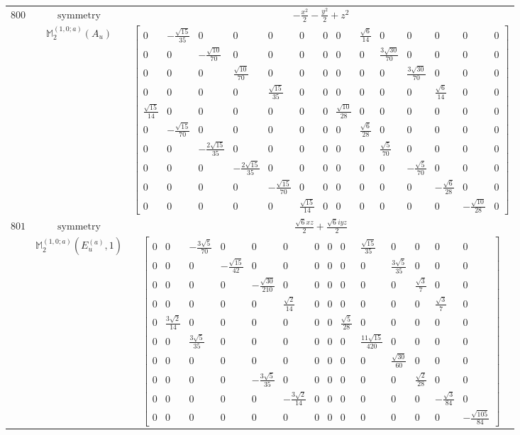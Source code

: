\documentclass[fleqn,8pt,landscape]{jsarticle}
\begin{document}
\begin{longtable}{ccc}
$ 800 $ & $ \text{symmetry} $ & $ - \frac{x^{2}}{2} - \frac{y^{2}}{2} + z^{2} $ \\
$  $ & $ \mathbb{M}_{2}^{(1,0;a)}(A_{u}) $ & $ \begin{bmatrix} 0 & - \frac{\sqrt{15}}{35} & 0 & 0 & 0 & 0 & 0 & 0 & \frac{\sqrt{6}}{14} & 0 & 0 & 0 & 0 & 0 \\ 0 & 0 & - \frac{\sqrt{10}}{70} & 0 & 0 & 0 & 0 & 0 & 0 & \frac{3 \sqrt{30}}{70} & 0 & 0 & 0 & 0 \\ 0 & 0 & 0 & \frac{\sqrt{10}}{70} & 0 & 0 & 0 & 0 & 0 & 0 & \frac{3 \sqrt{30}}{70} & 0 & 0 & 0 \\ 0 & 0 & 0 & 0 & \frac{\sqrt{15}}{35} & 0 & 0 & 0 & 0 & 0 & 0 & \frac{\sqrt{6}}{14} & 0 & 0 \\ \frac{\sqrt{15}}{14} & 0 & 0 & 0 & 0 & 0 & 0 & \frac{\sqrt{10}}{28} & 0 & 0 & 0 & 0 & 0 & 0 \\ 0 & - \frac{\sqrt{15}}{70} & 0 & 0 & 0 & 0 & 0 & 0 & \frac{\sqrt{6}}{28} & 0 & 0 & 0 & 0 & 0 \\ 0 & 0 & - \frac{2 \sqrt{15}}{35} & 0 & 0 & 0 & 0 & 0 & 0 & \frac{\sqrt{5}}{70} & 0 & 0 & 0 & 0 \\ 0 & 0 & 0 & - \frac{2 \sqrt{15}}{35} & 0 & 0 & 0 & 0 & 0 & 0 & - \frac{\sqrt{5}}{70} & 0 & 0 & 0 \\ 0 & 0 & 0 & 0 & - \frac{\sqrt{15}}{70} & 0 & 0 & 0 & 0 & 0 & 0 & - \frac{\sqrt{6}}{28} & 0 & 0 \\ 0 & 0 & 0 & 0 & 0 & \frac{\sqrt{15}}{14} & 0 & 0 & 0 & 0 & 0 & 0 & - \frac{\sqrt{10}}{28} & 0 \end{bmatrix} $ \\ \hline
$ 801 $ & $ \text{symmetry} $ & $ \frac{\sqrt{6} x z}{2} + \frac{\sqrt{6} i y z}{2} $ \\
$  $ & $ \mathbb{M}_{2}^{(1,0;a)}(E_{u}^{(a)},1) $ & $ \begin{bmatrix} 0 & 0 & - \frac{3 \sqrt{5}}{70} & 0 & 0 & 0 & 0 & 0 & 0 & \frac{\sqrt{15}}{35} & 0 & 0 & 0 & 0 \\ 0 & 0 & 0 & - \frac{\sqrt{15}}{42} & 0 & 0 & 0 & 0 & 0 & 0 & \frac{3 \sqrt{5}}{35} & 0 & 0 & 0 \\ 0 & 0 & 0 & 0 & - \frac{\sqrt{30}}{210} & 0 & 0 & 0 & 0 & 0 & 0 & \frac{\sqrt{3}}{7} & 0 & 0 \\ 0 & 0 & 0 & 0 & 0 & \frac{\sqrt{2}}{14} & 0 & 0 & 0 & 0 & 0 & 0 & \frac{\sqrt{3}}{7} & 0 \\ 0 & \frac{3 \sqrt{2}}{14} & 0 & 0 & 0 & 0 & 0 & 0 & \frac{\sqrt{5}}{28} & 0 & 0 & 0 & 0 & 0 \\ 0 & 0 & \frac{3 \sqrt{5}}{35} & 0 & 0 & 0 & 0 & 0 & 0 & \frac{11 \sqrt{15}}{420} & 0 & 0 & 0 & 0 \\ 0 & 0 & 0 & 0 & 0 & 0 & 0 & 0 & 0 & 0 & \frac{\sqrt{30}}{60} & 0 & 0 & 0 \\ 0 & 0 & 0 & 0 & - \frac{3 \sqrt{5}}{35} & 0 & 0 & 0 & 0 & 0 & 0 & \frac{\sqrt{2}}{28} & 0 & 0 \\ 0 & 0 & 0 & 0 & 0 & - \frac{3 \sqrt{2}}{14} & 0 & 0 & 0 & 0 & 0 & 0 & - \frac{\sqrt{3}}{84} & 0 \\ 0 & 0 & 0 & 0 & 0 & 0 & 0 & 0 & 0 & 0 & 0 & 0 & 0 & - \frac{\sqrt{105}}{84} \end{bmatrix} $ \\ \hline

\end{longtable}
\end{document}
